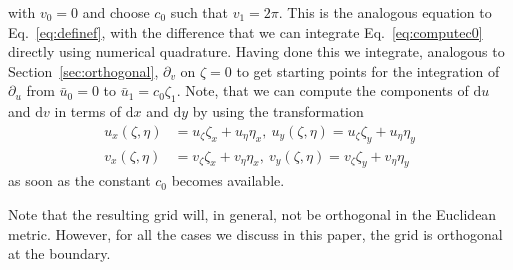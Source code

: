 \documentclass{hitec} %
\renewcommand{\d}{\mathrm{d}}
\begin{document}
 with $v_0 = 0$ and choose $c_0$ such that $v_1=2\pi$. This is the analogous
 equation to Eq.~\eqref{eq:definef}, with the difference that we can integrate
 Eq.~\eqref{eq:computec0} directly using numerical quadrature. 
Having done this we integrate, analogous to Section~\ref{sec:orthogonal}, 
$\partial_v $ on $\zeta=0$ to get starting points for the integration of $\partial_u$ 
from $\bar u_0 = 0$ to $\bar u_1= c_0 \zeta_1$.
Note, that we can compute the components of $\d u$ and $\d v$ in terms of $\d x$ and $\d y$ by using the transformation
\begin{subequations}
\begin{align}
  u_x(\zeta, \eta)  &= u_\zeta \zeta_x + u_\eta\eta_x,\ u_y(\zeta, \eta) = u_\zeta \zeta_y + u_\eta\eta_y\\
  v_x(\zeta, \eta)  &= v_\zeta \zeta_x + v_\eta\eta_x,\ v_y(\zeta, \eta) = v_\zeta \zeta_y + v_\eta\eta_y
\end{align} 
  \label{eq:chain_rule}
\end{subequations}
as soon as the constant $c_0$ becomes available. 

Note that the resulting grid will, in general, not be orthogonal 
in the Euclidean metric. However, for all the cases we discuss
in this paper, the grid is orthogonal at the boundary. 
\end{document}
